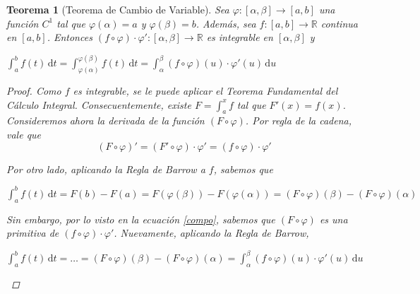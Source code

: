 \documentclass[]{article}
\newtheorem{teo}{Teorema}
\def\R{\mathbb{R}}
\newcommand{\integral}[4]{\int_{#1}^{#2} \! #3 \, \mathrm{d}#4}
\newcommand{\intres}[3]{\int_{#1}^{#2} \! #3}
\begin{document}
\begin{teo}[Teorema de Cambio de Variable]
	Sea $\varphi:[\alpha,\beta]\to[a,b]$ una función $C^1$ tal que $\varphi(\alpha) = a$ y $\varphi(\beta) = b$. Además, sea $f:[a,b]\to\R$ continua en $[a,b]$. Entonces $(f\circ\varphi)\cdot\varphi':[\alpha,\beta]\to\R$ es integrable en $[\alpha,\beta]$ y 
	\begin{center}
		$\displaystyle \integral{a}{b}{f(t)}{t} = \integral{\varphi(\alpha)}{\varphi(\beta)}{f(t)}{t} = \integral{\alpha}{\beta}{(f\circ\varphi)(u)\cdot\varphi'(u)}{u}$
	\end{center}
	\begin{proof}
		Como $f$ es integrable, se le puede aplicar el Teorema Fundamental del Cálculo Integral. Consecuentemente, existe $F = \intres{a}{x}{f}$ tal que $F'(x) = f(x)$. Consideremos ahora la derivada de la función $(F\circ\varphi)$. Por regla de la cadena, vale que
		\begin{equation}\label{compo}
			\displaystyle (F\circ\varphi)' = (F'\circ\varphi)\cdot\varphi' = (f\circ\varphi)\cdot\varphi'
		\end{equation}
		
		Por otro lado, aplicando la Regla de Barrow a $f$, sabemos que
		\begin{center}
			$\displaystyle \integral{a}{b}{f(t)}{t} = F(b) - F(a) = F(\varphi(\beta)) - F(\varphi(\alpha)) = (F\circ\varphi)(\beta) - (F\circ\varphi)(\alpha)$
		\end{center}
		
		Sin embargo, por lo visto en la ecuación \eqref{compo}, sabemos que $(F\circ\varphi)$ es una primitiva de $(f\circ\varphi)\cdot\varphi'$. Nuevamente, aplicando la Regla de Barrow,
		\begin{center}
			$\displaystyle \integral{a}{b}{f(t)}{t} = \hdots = (F\circ\varphi)(\beta) - (F\circ\varphi)(\alpha) = \integral{\alpha}{\beta}{(f\circ\varphi)(u)\cdot\varphi'(u)}{u}$
		\end{center}
	\end{proof}
\end{teo}
\end{document}
